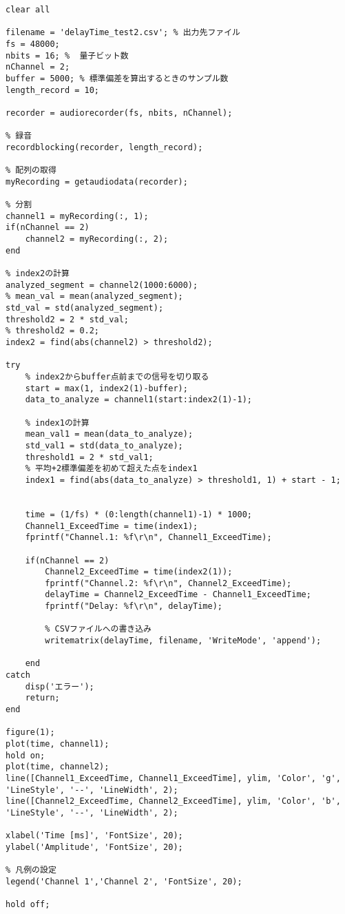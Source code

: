 \begin{lstlisting}[caption=MeasureDelayTime.m]
clear all

filename = 'delayTime_test2.csv'; % 出力先ファイル
fs = 48000; 
nbits = 16; %  量子ビット数
nChannel = 2; 
buffer = 5000; % 標準偏差を算出するときのサンプル数
length_record = 10; 

recorder = audiorecorder(fs, nbits, nChannel);

% 録音
recordblocking(recorder, length_record); 

% 配列の取得
myRecording = getaudiodata(recorder);

% 分割
channel1 = myRecording(:, 1);
if(nChannel == 2)
    channel2 = myRecording(:, 2);
end

% index2の計算
analyzed_segment = channel2(1000:6000);
% mean_val = mean(analyzed_segment);
std_val = std(analyzed_segment);
threshold2 = 2 * std_val;
% threshold2 = 0.2;
index2 = find(abs(channel2) > threshold2); 

try
    % index2からbuffer点前までの信号を切り取る
    start = max(1, index2(1)-buffer);  
    data_to_analyze = channel1(start:index2(1)-1);

    % index1の計算
    mean_val1 = mean(data_to_analyze);
    std_val1 = std(data_to_analyze);
    threshold1 = 2 * std_val1;
    % 平均+2標準偏差を初めて超えた点をindex1
    index1 = find(abs(data_to_analyze) > threshold1, 1) + start - 1;

    
    time = (1/fs) * (0:length(channel1)-1) * 1000;
    Channel1_ExceedTime = time(index1);
    fprintf("Channel.1: %f\r\n", Channel1_ExceedTime);

    if(nChannel == 2)
        Channel2_ExceedTime = time(index2(1));
        fprintf("Channel.2: %f\r\n", Channel2_ExceedTime);
        delayTime = Channel2_ExceedTime - Channel1_ExceedTime;
        fprintf("Delay: %f\r\n", delayTime);

        % CSVファイルへの書き込み
        writematrix(delayTime, filename, 'WriteMode', 'append');

    end
catch
    disp('エラー');
    return;
end

figure(1); 
plot(time, channel1);
hold on;
plot(time, channel2);
line([Channel1_ExceedTime, Channel1_ExceedTime], ylim, 'Color', 'g', 'LineStyle', '--', 'LineWidth', 2);
line([Channel2_ExceedTime, Channel2_ExceedTime], ylim, 'Color', 'b', 'LineStyle', '--', 'LineWidth', 2);

xlabel('Time [ms]', 'FontSize', 20);  
ylabel('Amplitude', 'FontSize', 20);  

% 凡例の設定
legend('Channel 1','Channel 2', 'FontSize', 20);

hold off;

\end{lstlisting}
    